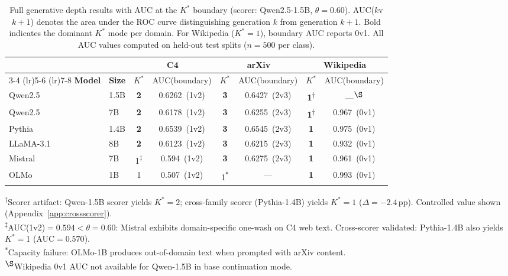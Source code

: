 \begin{table}[t]
\centering
\caption{Full generative depth results with AUC at the $K^*$ boundary (scorer: Qwen2.5-1.5B, $\theta{=}0.60$). AUC($k$v$k{+}1$) denotes the area under the ROC curve distinguishing generation $k$ from generation $k{+}1$. Bold indicates the dominant $K^*$ mode per domain. For Wikipedia ($K^*{=}1$), boundary AUC reports 0v1. All AUC values computed on held-out test splits ($n{=}500$ per class).}
\label{tab:domain_model_kstar_full}
{\small
\begin{tabular}{llcccccc}
\toprule
& & \multicolumn{2}{c}{\textbf{C4}} & \multicolumn{2}{c}{\textbf{arXiv}} & \multicolumn{2}{c}{\textbf{Wikipedia}} \\
\cmidrule(lr){3-4} \cmidrule(lr){5-6} \cmidrule(lr){7-8}
\textbf{Model} & \textbf{Size} & $K^*$ & AUC(boundary) & $K^*$ & AUC(boundary) & $K^*$ & AUC(boundary) \\
\midrule
Qwen2.5       & 1.5B & \textbf{2} & 0.6262~(1v2) & \textbf{3} & 0.6427~(2v3) & \textbf{1}\textsuperscript{$\dagger$} & ---\textsuperscript{$\S$} \\
Qwen2.5       & 7B   & \textbf{2} & 0.6178~(1v2) & \textbf{3} & 0.6255~(2v3) & \textbf{1}\textsuperscript{$\dagger$} & 0.967~(0v1) \\
Pythia        & 1.4B & \textbf{2} & 0.6539~(1v2) & \textbf{3} & 0.6545~(2v3) & \textbf{1} & 0.975~(0v1) \\
LLaMA-3.1    & 8B   & \textbf{2} & 0.6123~(1v2) & \textbf{3} & 0.6215~(2v3) & \textbf{1} & 0.932~(0v1) \\
Mistral       & 7B   & 1\textsuperscript{$\ddagger$} & 0.594~(1v2) & \textbf{3} & 0.6275~(2v3) & \textbf{1} & 0.961~(0v1) \\
OLMo          & 1B   & 1 & 0.507~(1v2) & 1\textsuperscript{$*$} & --- & \textbf{1} & 0.993~(0v1) \\
\bottomrule
\end{tabular}
}
\vspace{2pt}

{\footnotesize
\textsuperscript{$\dagger$}Scorer artifact: Qwen-1.5B scorer yields $K^*{=}2$; cross-family scorer (Pythia-1.4B) yields $K^*{=}1$ ($\Delta = -2.4$\,pp). Controlled value shown (Appendix~\ref{app:crossscorer}).\\
\textsuperscript{$\ddagger$}AUC(1v2)${=}0.594{<}\theta{=}0.60$: Mistral exhibits domain-specific one-wash on C4 web text. Cross-scorer validated: Pythia-1.4B also yields $K^*{=}1$ (AUC${=}0.570$).\\
\textsuperscript{$*$}Capacity failure: OLMo-1B produces out-of-domain text when prompted with arXiv content.\\
\textsuperscript{$\S$}Wikipedia 0v1 AUC not available for Qwen-1.5B in base continuation mode.
}
\end{table}
